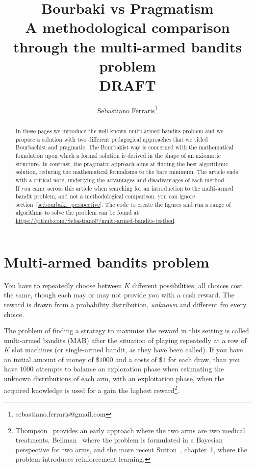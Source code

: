 \documentclass[]{scrartcl}
\title{Bourbaki vs Pragmatism \\ A methodological comparison through the multi-armed bandits problem \\
DRAFT}
\author{Sebastiano Ferraris\footnote{sebastiano.ferraris@gmail.com}}
\theoremstyle{definition}
\begin{document}
\maketitle

\begin{abstract}
In these pages we introduce the well known multi-armed bandits problem and we propose a solution with two different pedagogical approaches that we titled Bourbachist and pragmatic. The Bourbakist way is concerned with the mathematical foundation upon which a formal solution is derived in the shape of an axiomatic structure. In contrast, the pragmatic approach aims at finding the best algorithmic solution, reducing the mathematical formalisms to the bare minimum.
The article ends with a critical note, underlying the advantages and disadvantages of each method. \\

\noindent
If you came across this article when searching for an introduction to the multi-armed bandit problem, and not a methodological comparison, you can ignore section~\ref{se:bourbaki_perspective}. The code to create the figures and run a range of algorithms to solve the problem can be found at \href{https://github.com/SebastianoF/multi-armed-bandits-testbed}{https://github.com/SebastianoF/multi-armed-bandits-testbed}.
\end{abstract}


\section{Multi-armed bandits problem}
\label{se:intro}
You have to repeatedly choose between $K$ different possibilities, all choices cost the same, though each may or may not provide you with a cash reward. The reward is drawn from a probability distribution, \emph{unknown} and different fro every choice.

The problem of finding a strategy to maximise the reward in this setting is called multi-armed bandits (MAB) after the situation of playing repeatedly at a row of $K$ slot machines (or single-armed bandit, as they have been called). If you have an initial amount of money of $\$1000$ and a costs of $\$1$ for each draw, than you have $1000$ attempts to balance an exploration phase when estimating the unknown distributions of each arm, with an exploitation phase, when the acquired knowledge is used for a gain the highest reward\footnote{Thompson~\cite{thompson1933likelihood} provides an early approach where the two arms are two medical treatments, Bellman~\cite{bellman1956problem} where the problem is formulated in a Bayesian perspective for two arms, and the more recent Sutton~\cite{sutton2018reinforcement}, chapter~1, where the problem introduces reinforcement learning.}.
\end{document}
